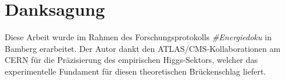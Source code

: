 \documentclass[11pt,a4paper,twocolumn]{article}
\begin{document}
	\section*{Danksagung}
	Diese Arbeit wurde im Rahmen des Forschungsprotokolls \textit{\#Energiedoku} in Bamberg erarbeitet. Der Autor dankt den ATLAS/CMS-Kollaborationen am CERN für die Präzisierung des empirischen Higgs-Sektors, welcher das experimentelle Fundament für diesen theoretischen Brückenschlag liefert.
	
\end{document}
